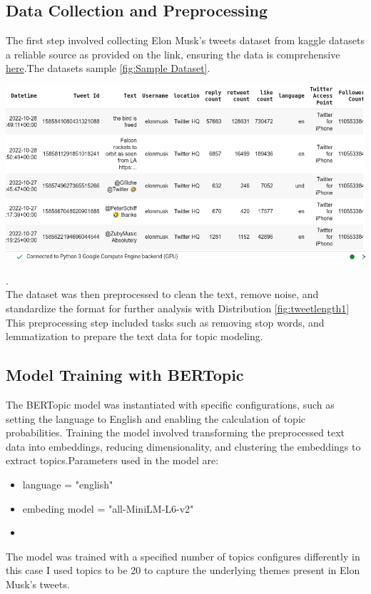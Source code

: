 \documentclass[12pt]{article}
\begin{document}
\subsection{Data Collection and Preprocessing}
   The first step involved collecting Elon Musk's tweets dataset from kaggle  datasets a reliable source as  provided  on the  link, ensuring the data is  comprehensive \href{https://www.kaggle.com/datasets/alexhuggler/elon-tweets-wsentimentclassified-via-roberta?select=ElonTweets%28Sentiment%29+10-28-22.csv}{here}.The datasets  sample  \ref{fig:Sample  Dataset}. \\  
\begin{minipage}{0.48\textwidth}
    \centering
    \includegraphics[width=\linewidth]{Images/datatweets.png}
    \label{fig:Sample  Dataset}
\end{minipage}. \\ The dataset was then preprocessed to clean the text, remove noise, and standardize the format for further analysis with Distribution \ref{fig:tweetlength1}
   This preprocessing step included tasks such as removing stop words, and lemmatization to prepare the text data for topic modeling.
\newpage

\subsection{Model Training with BERTopic}
    \par
    The BERTopic model was instantiated with specific configurations, such as setting the language to English and enabling the calculation of topic probabilities. Training the model involved transforming the preprocessed text data into embeddings, reducing dimensionality, and clustering the embeddings to extract topics.Parameters  used  in  the  model are:
    \begin{itemize}
        \item language = "english"
        \item embeding model  = "all-MiniLM-L6-v2" 
        \item  {}
    \end{itemize}The model was trained with a specified number of topics configures  differently in this case  I  used topics  to be 20 to capture the underlying themes present in Elon Musk's tweets.
\end{document}
